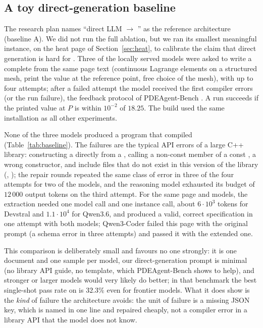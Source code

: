 \subsection{A toy direct-generation baseline}
\label{sec:baseline}
The research plan names ``direct LLM $\to$ \dealii{}'' as the reference architecture (baseline A). We did not run the full ablation, but we ran its smallest meaningful instance, on the heat page of Section~\ref{sec:heat}, to calibrate the claim that direct generation is hard for \dealii{}. Three of the locally served models were asked to write a complete  from the same page text (continuous Lagrange elements on a structured mesh, print the value at the reference point, free choice of the mesh), with up to four attempts; after a failed attempt the model received the first compiler errors (or the run failure), the feedback protocol of PDEAgent-Bench \citep{pdeagentbench2026}. A run succeeds if the printed value at $P$ is within $10^{-2}$ of $18.25$. The build used the same \dealii{} installation as all other experiments.

\begin{table}[t]
\centering\small
\caption{Direct generation of a \dealii{} program for the heat page (one document, temperature $0$, at most four attempts with compiler feedback). Tokens are summed over all calls.}
\label{tab:baseline}

\end{table}

None of the three models produced a program that compiled (Table~\ref{tab:baseline}). The failures are the typical API errors of a large C++ library: constructing a  directly from a , calling a non-const member of a const , a wrong  constructor, and include files that do not exist in this version of the library (, ); the repair rounds repeated the same class of error in three of the four attempts for two of the models, and the reasoning model exhausted its budget of $12\,000$ output tokens on the third attempt. For the same page and models, the \femagent{} extraction needed one model call and one instance call, about $6\cdot10^3$ tokens for Devstral and $1.1\cdot10^4$ for Qwen3.6, and produced a valid, correct specification in one attempt with both models; Qwen3-Coder failed this page with the original prompt (a schema error in three attempts) and passed it with the extended one.

This comparison is deliberately small and favours no one strongly: it is one document and one sample per model, our direct-generation prompt is minimal (no library API guide, no template, which PDEAgent-Bench shows to help), and stronger or larger models would very likely do better; in that benchmark the best single-shot pass rate on \dealii{} is $32.3\%$ even for frontier models. What it does show is the \emph{kind} of failure the architecture avoids: the unit of failure is a missing JSON key, which is named in one line and repaired cheaply, not a compiler error in a library API that the model does not know.
